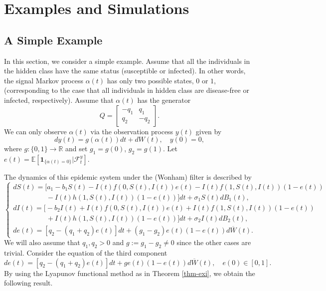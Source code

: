 \documentclass[12pt]{amsart}
\theoremstyle{remark}
\numberwithin{equation}{section}
\newcommand{\F}{\mathcal{F}}
\newcommand{\E}{\mathbb{E}}
\newcommand{\R}{\mathbb{R}}
\numberwithin{equation}{section}
\newcommand{\1}{\boldsymbol{1}}
\def\bar{\overline}
\begin{document}
\section{Examples and Simulations}\label{sec:exp}
\subsection{A Simple Example}
In this section, we consider a simple example.
Assume that all the individuals in the hidden class have the same status (susceptible or infected).
In other words, the signal Markov process $\alpha(t)$ has only two possible states, $0$ or $1$, (corresponding to the case that all individuals in hidden class are disease-free or infected, respectively).
Assume that $\alpha(t)$ has the generator
$$
Q=
\begin{bmatrix}
-q_1 &q_1\\
q_2&-q_2
\end{bmatrix}.
$$
We can only observe $\alpha(t)$ via the observation process $y(t)$ given by
$$
dy(t)=g(\alpha(t))dt+dW(t),\quad y(0)=0,
$$
where $g:\{0,1\}\to\R$ and set $g_1=g(0)$, $g_2=g(1)$. Let $e(t)=\E[\1_{\{\alpha(t)=0\}}|\F_t^y]$.

The dynamics of this epidemic system under the (Wonham) filter is described by
\begin{equation}\label{eq-ex-1}
\begin{cases}
dS(t)=\Big[a_1-b_1S(t)-I(t)f(0,S(t),I(t))e(t)-I(t)f(1,S(t),I(t))(1-e(t))\\
\hspace{2cm}-I(t)h(1,S(t),I(t))(1-e(t))\Big]dt + \sigma_1 S(t) dB_1(t),\\[1ex]
dI(t)=\Big[-b_2I(t) + I(t)f(0,S(t),I(t))e(t)+I(t)f(1,S(t),I(t))(1-e(t))\\
\hspace{2cm}+I(t)h(1,S(t),I(t))(1-e(t))\Big]dt + \sigma_2I(t) dB_2(t),\\
de(t)=[q_2-(q_1+q_2)e(t)]dt+(g_1-g_2)e(t)(1-e(t))d\bar W(t).
\end{cases}
\end{equation}
We will also assume that $q_1,q_2>0$ and $g:=g_1-g_2\neq 0$ since the other cases are trivial.
Consider the equation of the third component
\begin{equation}\label{eq-e}
de(t)=[q_2-(q_1+q_2)e(t)]dt+ge(t)(1-e(t))d\bar W(t),\quad e(0)\in [0,1].
\end{equation}
By using the Lyapunov functional method as in Theorem \ref{thm-exi}, we obtain the following result.
\end{document}
